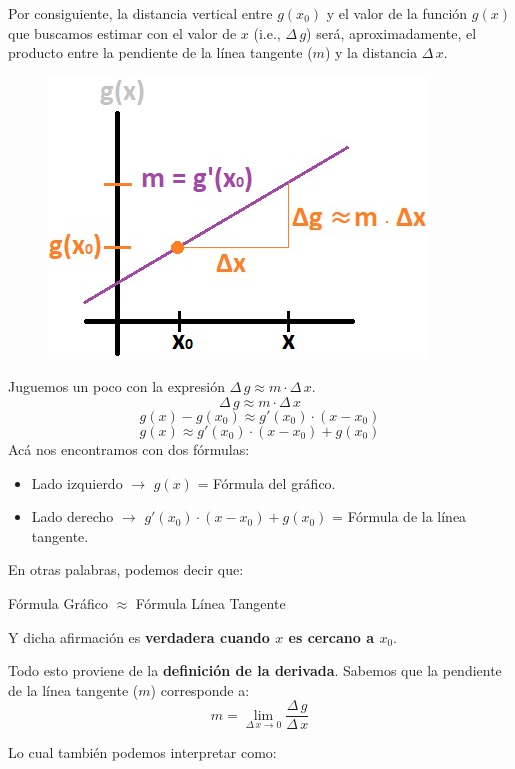 \documentclass[12pt]{article}
\begin{document}
Por consiguiente, la distancia vertical entre $g(x_{0})$ y el valor de la función $g(x)$ que buscamos estimar con el valor de $x$ (i.e., $\Delta \, g$) será, aproximadamente, el producto entre la pendiente de la línea tangente ($m$) y la distancia $\Delta \, x$.

\newpage

\begin{figure}[hbt!]
\centering
\includegraphics[scale=0.7]{img/approx_lin_gral_expl_2.jpg}
\end{figure}

Juguemos un poco con la expresión $\Delta \, g \approx m \cdot \Delta \, x$.
\[\Delta \, g \approx m \cdot \Delta \, x\]
\[g(x) - g(x_{0}) \approx g'(x_{0}) \cdot (x - x_{0})\]
\[g(x) \approx g'(x_{0}) \cdot (x - x_{0}) + g(x_{0})\]
Acá nos encontramos con dos fórmulas:

\begin{itemize}
\item Lado izquierdo $\rightarrow$ $g(x)$ = Fórmula del gráfico.
\item Lado derecho $\rightarrow$ $g'(x_{0}) \cdot (x - x_{0}) + g(x_{0})$ = Fórmula de la línea tangente.
\end{itemize}

En otras palabras, podemos decir que:

\centerline{Fórmula Gráfico $\approx$ Fórmula Línea Tangente}

Y dicha afirmación es \textbf{verdadera cuando $x$ es cercano a $x_{0}$}.

Todo esto proviene de la \textbf{definición de la derivada}. Sabemos que la pendiente de la línea tangente ($m$) corresponde a:
\[m = \lim_{\Delta \, x \to 0} \frac{\Delta \, g}{\Delta \, x}\]

\newpage

Lo cual también podemos interpretar como:
\end{document}
